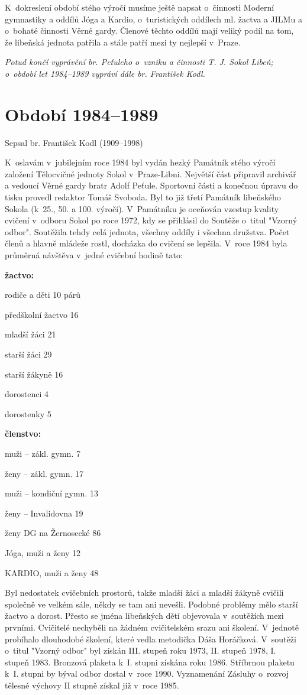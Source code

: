 \documentclass[a5paper, 12pt, twoside]{article}
\begin{document}
K~dokreslení období stého výročí musíme ještě napsat o~činnosti Moderní
gymnastiky a oddílů Jóga a Kardio, o~turistických oddílech ml. žactva a
JILMu a o~bohaté činnosti Věrné gardy. Členové těchto oddílů mají veliký
podíl na tom, že libeňská jednota patřila a stále patří mezi ty nejlepší
v~Praze.

\textit{Potud končí vyprávění br. Peťuleho o~vzniku a činnosti T. J. Sokol
Libeň; o~období let 1984--1989 vypráví dále br. František Kodl.}

\section{Období 1984--1989}

Sepsal br. František Kodl (1909--1998)

K~oslavám v~jubilejním roce 1984 byl vydán hezký Památník stého výročí
založení Tělocvičné jednoty Sokol v~Praze-Libni. Největší část připravil
archivář a vedoucí Věrné gardy bratr Adolf Peťule. Sportovní části a
konečnou úpravu do tisku provedl redaktor Tomáš Svoboda. Byl to již
třetí Památník libeňského Sokola (k~25., 50. a 100. výročí). V~Památníku
je oceňován vzestup kvality cvičení v~odboru Sokol po roce 1972, kdy se
přihlásil do Soutěže o~titul "Vzorný odbor". Soutěžila tehdy celá
jednota, všechny oddíly i všechna družstva. Počet členů a hlavně mládeže
rostl, docházka do cvičení se lepšila. V~roce 1984 byla průměrná
návštěva v~jedné cvičební hodině tato:

\textbf{žactvo:}

rodiče a děti 10 párů

předškolní žactvo 16

mladší žáci 21

starší žáci 29

starší žákyně 16

dorostenci 4

dorostenky 5

\textbf{členstvo:}

muži -- zákl. gymn. 7

ženy -- zákl. gymn. 17

muži -- kondiční gymn. 13

ženy -- Invalidovna 19

ženy DG na Žernosecké 86

Jóga, muži a ženy 12

KARDIO, muži a ženy 48

Byl nedostatek cvičebních prostorů, takže mladší žáci a mladší žákyně
cvičili společně ve velkém sále, někdy se tam ani nevešli. Podobné
problémy mělo starší žactvo a dorost. Přesto se jména libeňských dětí
objevovala v~soutěžích mezi prvními. Cvičitelé nechyběli na žádném
cvičitelském srazu ani školení. V~jednotě probíhalo dlouhodobé školení,
které vedla metodička Dáša Horáčková. V~soutěži o~titul "Vzorný odbor"
byl získán III. stupeň roku 1973, II. stupeň 1978, I. stupeň 1983.
Bronzová plaketa k~I. stupni získána roku 1986. Stříbrnou plaketu k~I.
stupni by býval odbor dostal v~roce 1990. Vyznamenání Zásluhy o~rozvoj
tělesné výchovy II stupně získal již v~roce 1985.
\end{document}
